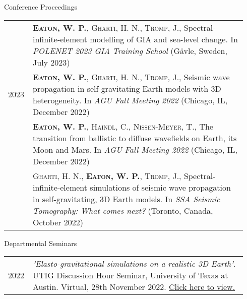 \documentclass{resume}
\begin{document}
\vspace{0.2cm}
\begin{rSection}{Conference Proceedings}
\begin{tabular}{p{0.07\linewidth} | p{0.87\linewidth}}

\multirow{3}{*}{2023}  &  \textsc{\textbf{Eaton, W. P.}, Gharti, H. N., Tromp, J}., Spectral-infinite-element modelling of GIA 
and sea-level change. In \textit{POLENET 2023 GIA Training School} (Gävle, Sweden, July 2023) \vspace{0.15cm} \\
\multirow{3}{*}{2022}  &  \textsc{\textbf{Eaton, W. P.}, Gharti, H. N., Tromp, J}., Seismic wave propagation in self-gravitating Earth models with 3D  heterogeneity. In \textit{AGU Fall Meeting 2022} (Chicago, IL, December 2022) \vspace{0.15cm} \\ &  \textsc{\textbf{Eaton, W. P.}, Haindl, C., Nissen-Meyer, T}., The transition from ballistic to diffuse wavefields on Earth, its Moon and Mars. In \textit{AGU Fall Meeting 2022} (Chicago, IL, December 2022) \vspace{0.15cm} \\ & \textsc{Gharti, H. N., \textbf{Eaton, W. P.}, Tromp, J}., Spectral-infinite-element simulations of seismic wave propagation in self-gravitating, 3D Earth models. In \textit{SSA Seismic Tomography: What comes next?} (Toronto, Canada, October 2022) \\
\end{tabular}

\end{rSection}


\vspace{0.2cm}
\begin{rSection}{Departmental Seminars}

\begin{tabular}{p{0.07\linewidth} | p{0.87\linewidth}}
 & \textit{'Elasto-gravitational simulations on a realistic 3D Earth'}. UTIG Discussion Hour Seminar, University of Texas at Austin. Virtual, 28th November 2022. \href{https://www.youtube.com/watch?v=ttSH5xntpOM&t=2662s&ab_channel=UniversityofTexasInstituteforGeophysics}{Click here to view.} \\  
\end{tabular}
\end{rSection}
\end{document}
